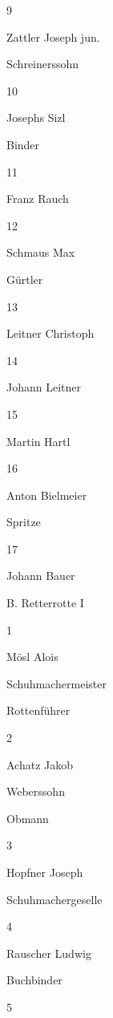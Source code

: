 \documentclass{book}
\begin{document}
9

Zattler Joseph jun.

Schreinerssohn



10

Josephs Sizl

Binder



11

Franz Rauch





12

Schmaus Max

Gürtler



13

Leitner Christoph





14

Johann Leitner





15

Martin Hartl





16

Anton Bielmeier



Spritze

17

Johann Bauer







B. Retterrotte I

1

Mösl Alois

Schuhmachermeister

Rottenführer

2

Achatz Jakob

Weberssohn

Obmann

3

Hopfner Joseph

Schuhmachergeselle



4

Rauscher Ludwig

Buchbinder



5
\end{document}

